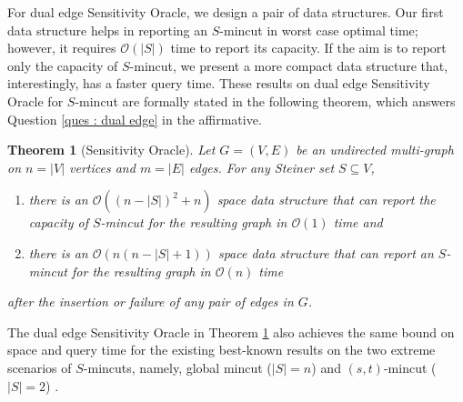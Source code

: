 \documentclass[letterpaper,11pt]{article}
\newtheorem{theorem}{Theorem}[]
\begin{document}
For dual edge Sensitivity Oracle, we design a pair of data structures. Our first data structure helps in reporting an $S$-mincut in worst case optimal time; however, it requires ${\mathcal O}(|S|)$ time to report its capacity. If the aim is to report only the capacity of $S$-mincut, we present a more compact data structure that, interestingly, has a faster query time.
These results on dual edge Sensitivity Oracle for $S$-mincut are formally stated in the following theorem, which answers Question \ref{ques : dual edge} in the affirmative.
\begin{theorem}[Sensitivity Oracle] \label{thm : dual edge failure}
     Let $G=(V,E)$ be an undirected multi-graph on $n=|V|$ vertices and $m=|E|$ edges. For any Steiner set $S\subseteq V$, 
     \begin{enumerate}
         \item  there is an ${\mathcal O}((n-|S|)^2+n)$ space data structure that can report the capacity of $S$-mincut for the resulting graph in ${\mathcal O}(1)$ time and 
         \item there is an ${\mathcal O}(n(n-|S|+1))$ space data structure that can report an $S$-mincut for the resulting graph in ${\mathcal O}(n)$ time
     \end{enumerate}
     after the insertion or failure of any pair of edges in $G$.
\end{theorem}
The dual edge Sensitivity Oracle in Theorem \ref{thm : dual edge failure} also achieves the same bound on space and query time for the existing best-known results on the two extreme scenarios of $S$-mincuts, namely, global mincut ($|S|=n$) \cite{DBLP:conf/stoc/DinitzN95} and $(s,t)$-mincut ($|S|=2$) \cite{DBLP:journals/talg/BaswanaBP23}.   
\end{document}
